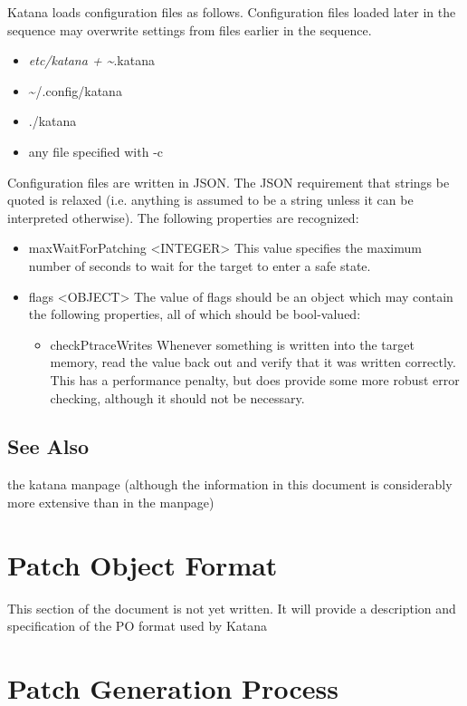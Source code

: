 \documentclass[11pt]{article}
\begin{document}
   Katana loads configuration files as follows. Configuration files
   loaded later in the sequence may overwrite settings from files
   earlier in the sequence.
\begin{itemize}
\item \emph{etc/katana    + \~{}}.katana
\item \~{}/.config/katana
\item ./katana
\item any file specified with -c
\end{itemize}
   Configuration files are written in JSON. The JSON requirement that
   strings be quoted is relaxed (i.e. anything is assumed to be a
   string unless it can be interpreted otherwise). The following
   properties are recognized:
\begin{itemize}
\item maxWaitForPatching <INTEGER>
     This value specifies the maximum number of seconds to wait for
     the target to enter a safe state.
\item flags <OBJECT>
     The value of flags should be an object which may contain the
     following properties, all of which should be bool-valued:

\begin{itemize}
\item checkPtraceWrites
       Whenever something is written into the target memory, read the
       value back out and verify that it was written correctly. This
       has a performance penalty, but does provide some more robust
       error checking, although it should not be necessary.
\end{itemize}

\end{itemize}
\subsection{See Also}
\label{sec-6.7}

   the katana manpage (although the information in this document is
   considerably more extensive than in the manpage)
\section{Patch Object Format}
\label{sec-7}

  This section of the document is not yet written. It will provide a description and specification of the PO format used by Katana
\section{Patch Generation Process}
\label{sec-8}
\end{document}
